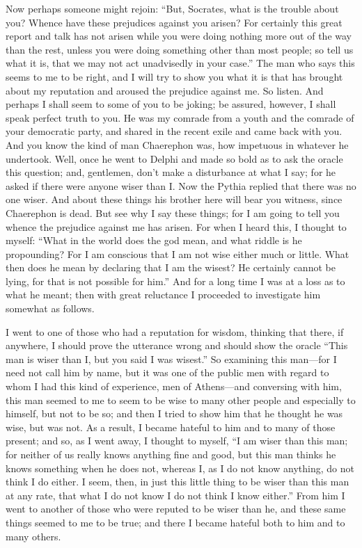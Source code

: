 Now perhaps someone might rejoin: “But, Socrates, what is the trouble about you? Whence have these prejudices against you arisen? For certainly this great report and talk has not arisen while you were doing nothing more out of the way than the rest, unless you were doing something other than most people; so tell us  what it is, that we may not act unadvisedly in your case.” The man who says this seems to me to be right, and I will try to show you what it is that has brought about my reputation and aroused the prejudice against me. So listen. And perhaps I shall seem to some of you to be joking; be assured, however, I shall speak perfect truth to you.  He was my comrade from a youth and the comrade of your democratic party, and shared in the recent exile and came back with you. And you know the kind of man Chaerephon was, how impetuous in whatever he undertook. Well, once he went to Delphi and made so bold as to ask the oracle this question; and, gentlemen, don't make a disturbance at what I say; for he asked if there were anyone wiser than I. Now the Pythia replied that there was no one wiser. And about these things his brother here will bear you witness, since Chaerephon is dead.  But see why I say these things; for I am going to tell you whence the prejudice against me has arisen. For when I heard this, I thought to myself: “What in the world does the god mean, and what riddle is he propounding? For I am conscious that I am not wise either much or little. What then does he mean by declaring that I am the wisest? He certainly cannot be lying, for that is not possible for him.” And for a long time I was at a loss as to what he meant; then with great reluctance I proceeded to investigate him somewhat as follows.

I went to one of those who had a reputation for wisdom,  thinking that there, if anywhere, I should prove the utterance wrong and should show the oracle “This man is wiser than I, but you said I was wisest.” So examining this man—for I need not call him by name, but it was one of the public men with regard to whom I had this kind of experience, men of Athens—and conversing with him, this man seemed to me to seem to be wise to many other people and especially to himself, but not to be so; and then I tried to show him that he thought  he was wise, but was not. As a result, I became hateful to him and to many of those present; and so, as I went away, I thought to myself, “I am wiser than this man; for neither of us really knows anything fine and good, but this man thinks he knows something when he does not, whereas I, as I do not know anything, do not think I do either. I seem, then, in just this little thing to be wiser than this man at any rate, that what I do not know I do not think I know either.” From him I went to another of those who were reputed  to be wiser than he, and these same things seemed to me to be true; and there I became hateful both to him and to many others.

